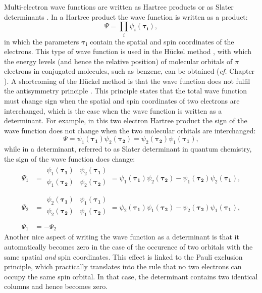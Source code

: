 Multi-electron wave functions are written as Hartree products \cite{hartree1,hartree2,hartree3} or as Slater determinants \cite{slater}. In a Hartree product the wave function is written as a product:
\begin{equation}
\Psi=\prod_i \psi_i(\mathbf{\tau_i}),
\end{equation}
in which the parameters $\mathbf{\tau_i}$ contain the spatial and spin coordinates of the electrons. This type of wave function is used in the H\"uckel method \cite{huckel1,huckel2,huckel3}, with which the energy levels (and hence the relative position) of molecular orbitals of $\pi$ electrons in conjugated molecules, such as benzene, can be obtained (\textit{cf.} Chapter \chhuckel). A shortcoming of the H\"uckel method is that the wave function does not fulfil the antisymmetry principle \cite{atkins}. This principle states that the total wave function must change sign when the spatial and spin coordinates of two electrons are interchanged, which is the case when the wave function is written as a determinant. For example, in this two electron Hartree product the sign of the wave function does not change when the two molecular orbitals are interchanged:
\begin{equation}
\Psi=\psi_1(\mathbf{\tau_1})\psi_2(\mathbf{\tau_2}) = \psi_2(\mathbf{\tau_2})\psi_1(\mathbf{\tau_1}),
\end{equation}
while in a determinant, referred to as Slater determinant in quantum chemistry, the sign of the wave function does change:
\begin{equation}
\begin{split}
\Psi_1 &=
\begin{array}{|cc|}
\psi_1(\mathbf{\tau_1}) & \psi_2(\mathbf{\tau_1}) \\
\psi_1(\mathbf{\tau_2}) & \psi_2(\mathbf{\tau_2}) \\
\end{array}
= \psi_1(\mathbf{\tau_1})\psi_2(\mathbf{\tau_2}) - \psi_1(\mathbf{\tau_2})\psi_2(\mathbf{\tau_1}), \\
\Psi_2 &=
\begin{array}{|cc|}
\psi_2(\mathbf{\tau_1}) & \psi_1(\mathbf{\tau_1}) \\
\psi_2(\mathbf{\tau_2}) & \psi_1(\mathbf{\tau_2}) \\
\end{array}
= \psi_2(\mathbf{\tau_1})\psi_1(\mathbf{\tau_2}) - \psi_2(\mathbf{\tau_2})\psi_1(\mathbf{\tau_1}), \\
\Psi_1 &= - \Psi_2
\end{split}
\end{equation}
Another nice aspect of writing the wave function as a determinant is that it automatically becomes zero in the case of the occurence of two orbitals with the same spatial \textit{and} spin coordinates. This effect is linked to the Pauli exclusion principle, which practically translates into the rule that no two electrons can occupy the same spin orbital. In that case, the determinant contains two identical columns and hence becomes zero.

